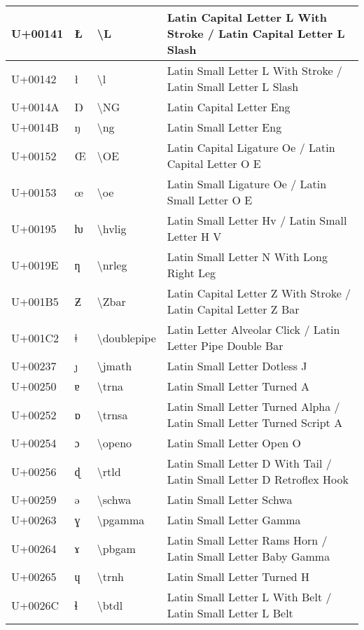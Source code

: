 \begin{table}[h]
\begin{tabulary}{\linewidth}{|L|L|L|L|}
U+00141 & Ł & {\textbackslash}L & Latin Capital Letter L With Stroke / Latin Capital Letter L Slash \\
\hline
U+00142 & ł & {\textbackslash}l & Latin Small Letter L With Stroke / Latin Small Letter L Slash \\
\hline
U+0014A & Ŋ & {\textbackslash}NG & Latin Capital Letter Eng \\
\hline
U+0014B & ŋ & {\textbackslash}ng & Latin Small Letter Eng \\
\hline
U+00152 & Œ & {\textbackslash}OE & Latin Capital Ligature Oe / Latin Capital Letter O E \\
\hline
U+00153 & œ & {\textbackslash}oe & Latin Small Ligature Oe / Latin Small Letter O E \\
\hline
U+00195 & ƕ & {\textbackslash}hvlig & Latin Small Letter Hv / Latin Small Letter H V \\
\hline
U+0019E & ƞ & {\textbackslash}nrleg & Latin Small Letter N With Long Right Leg \\
\hline
U+001B5 & Ƶ & {\textbackslash}Zbar & Latin Capital Letter Z With Stroke / Latin Capital Letter Z Bar \\
\hline
U+001C2 & ǂ & {\textbackslash}doublepipe & Latin Letter Alveolar Click / Latin Letter Pipe Double Bar \\
\hline
U+00237 & ȷ & {\textbackslash}jmath & Latin Small Letter Dotless J \\
\hline
U+00250 & ɐ & {\textbackslash}trna & Latin Small Letter Turned A \\
\hline
U+00252 & ɒ & {\textbackslash}trnsa & Latin Small Letter Turned Alpha / Latin Small Letter Turned Script A \\
\hline
U+00254 & ɔ & {\textbackslash}openo & Latin Small Letter Open O \\
\hline
U+00256 & ɖ & {\textbackslash}rtld & Latin Small Letter D With Tail / Latin Small Letter D Retroflex Hook \\
\hline
U+00259 & ə & {\textbackslash}schwa & Latin Small Letter Schwa \\
\hline
U+00263 & ɣ & {\textbackslash}pgamma & Latin Small Letter Gamma \\
\hline
U+00264 & ɤ & {\textbackslash}pbgam & Latin Small Letter Rams Horn / Latin Small Letter Baby Gamma \\
\hline
U+00265 & ɥ & {\textbackslash}trnh & Latin Small Letter Turned H \\
\hline
U+0026C & ɬ & {\textbackslash}btdl & Latin Small Letter L With Belt / Latin Small Letter L Belt \\

\end{tabulary}
\end{table}
